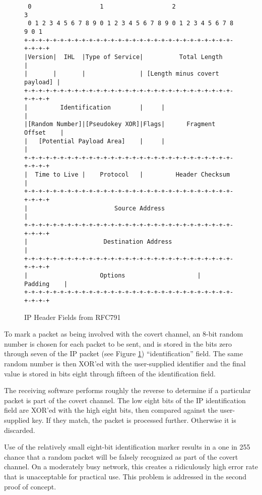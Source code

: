\documentclass[letterpaper,10pt,draft]{article}
\begin{document}
\begin{figure}
\begin{center}
\begin{verbatim}
 0                   1                   2                   3   
 0 1 2 3 4 5 6 7 8 9 0 1 2 3 4 5 6 7 8 9 0 1 2 3 4 5 6 7 8 9 0 1 
+-+-+-+-+-+-+-+-+-+-+-+-+-+-+-+-+-+-+-+-+-+-+-+-+-+-+-+-+-+-+-+-+
|Version|  IHL  |Type of Service|          Total Length         |
|       |       |               | [Length minus covert payload] |
+-+-+-+-+-+-+-+-+-+-+-+-+-+-+-+-+-+-+-+-+-+-+-+-+-+-+-+-+-+-+-+-+
|         Identification        |     |                         |
|[Random Number]|[Pseudokey XOR]|Flags|      Fragment Offset    |
|   [Potential Payload Area]    |     |                         |
+-+-+-+-+-+-+-+-+-+-+-+-+-+-+-+-+-+-+-+-+-+-+-+-+-+-+-+-+-+-+-+-+
|  Time to Live |    Protocol   |         Header Checksum       |
+-+-+-+-+-+-+-+-+-+-+-+-+-+-+-+-+-+-+-+-+-+-+-+-+-+-+-+-+-+-+-+-+
|                        Source Address                         |
+-+-+-+-+-+-+-+-+-+-+-+-+-+-+-+-+-+-+-+-+-+-+-+-+-+-+-+-+-+-+-+-+
|                     Destination Address                       |
+-+-+-+-+-+-+-+-+-+-+-+-+-+-+-+-+-+-+-+-+-+-+-+-+-+-+-+-+-+-+-+-+
|                    Options                    |    Padding    |
+-+-+-+-+-+-+-+-+-+-+-+-+-+-+-+-+-+-+-+-+-+-+-+-+-+-+-+-+-+-+-+-+
\end{verbatim}
\caption{IP Header Fields from RFC791}
\label{IPHeader}
\end{center}
\end{figure}

To mark a packet as being involved with the covert channel, an 8-bit
random number is chosen for each packet to be sent, and is stored in
the bits zero through seven of the IP packet (see Figure 
\ref{IPHeader}) ``identification'' field.  The same random number is then
XOR'ed with the user-supplied identifier and the final value is stored
in bits eight through fifteen of the identification field.

The receiving software performs roughly the reverse to determine if a
particular packet is part of the covert channel.  The low eight bits
of the IP identification field are XOR'ed with the high eight bits,
then compared against the user-supplied key.  If they match, the
packet is processed further.  Otherwise it is discarded.

Use of the relatively small eight-bit identification marker results in
a one in 255 chance that a random packet will be falsely recognized as
part of the covert channel.  On a moderately busy network, this
creates a ridiculously high error rate that is unacceptable for
practical use.  This problem is addressed in the second proof of concept.
\end{document}
